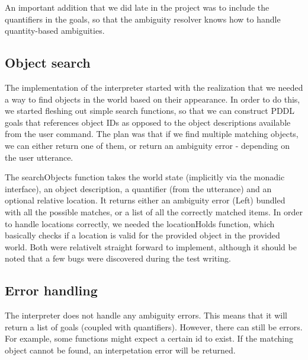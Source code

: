 An important addition that we did late in the project was to include the quantifiers in the goals, so that the ambiguity resolver knows how to handle quantity-based ambiguities.

\subsection*{Object search}
The implementation of the interpreter started with the realization that we needed a way to find objects in the world based on their appearance. In order to do this, we started fleshing out simple search functions, so that we can construct PDDL goals that references object IDs as opposed to the object descriptions available from the user command. The plan was that if we find multiple matching objects, we can either return one of them, or return an ambiguity error - depending on the user utterance.

The searchObjects function takes the world state (implicitly via the monadic interface), an object description, a quantifier (from the utterance) and an optional relative location. It returns either an ambiguity error (Left) bundled with all the possible matches, or a list of all the correctly matched items. In order to handle locations correctly, we needed the locationHolds function, which basically checks if a location is valid for the provided object in the provided world. Both were relativelt straight forward to implement, although it should be noted that a few bugs were discovered during the test writing.

\subsection*{Error handling}
The interpreter does not handle any ambiguity errors. This means that it will return a list of goals (coupled with quantifiers). However, there can still be errors. For example, some functions might expect a certain id to exist. If the matching object cannot be found, an interpetation error will be returned.
